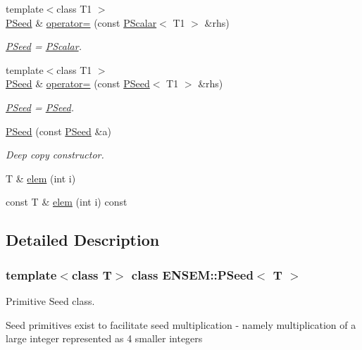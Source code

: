 \begin{DoxyCompactItemize}
{\footnotesize template$<$class T1 $>$ }\\\mbox{\hyperlink{classENSEM_1_1PSeed}{P\+Seed}} \& \mbox{\hyperlink{classENSEM_1_1PSeed_aa7d9ec1f6a7cca8ee109c29d75482350}{operator=}} (const \mbox{\hyperlink{classENSEM_1_1PScalar}{P\+Scalar}}$<$ T1 $>$ \&rhs)
\begin{DoxyCompactList}\small\item\em \mbox{\hyperlink{classENSEM_1_1PSeed}{P\+Seed}} = \mbox{\hyperlink{classENSEM_1_1PScalar}{P\+Scalar}}. \end{DoxyCompactList}\item 
{\footnotesize template$<$class T1 $>$ }\\\mbox{\hyperlink{classENSEM_1_1PSeed}{P\+Seed}} \& \mbox{\hyperlink{classENSEM_1_1PSeed_a22c88645227bfddbfea703ed71117795}{operator=}} (const \mbox{\hyperlink{classENSEM_1_1PSeed}{P\+Seed}}$<$ T1 $>$ \&rhs)
\begin{DoxyCompactList}\small\item\em \mbox{\hyperlink{classENSEM_1_1PSeed}{P\+Seed}} = \mbox{\hyperlink{classENSEM_1_1PSeed}{P\+Seed}}. \end{DoxyCompactList}\item 
\mbox{\hyperlink{classENSEM_1_1PSeed_a3a38a0e42c0c2ed2996eff03e32eebdc}{P\+Seed}} (const \mbox{\hyperlink{classENSEM_1_1PSeed}{P\+Seed}} \&a)
\begin{DoxyCompactList}\small\item\em Deep copy constructor. \end{DoxyCompactList}\item 
T \& \mbox{\hyperlink{classENSEM_1_1PSeed_aeed16139a22df65e16fd064b7808c49a}{elem}} (int i)
\item 
const T \& \mbox{\hyperlink{classENSEM_1_1PSeed_aa9151226aec3137be3417bbf36f770aa}{elem}} (int i) const
\end{DoxyCompactItemize}


\subsection{Detailed Description}
\subsubsection*{template$<$class T$>$\newline
class E\+N\+S\+E\+M\+::\+P\+Seed$<$ T $>$}

Primitive Seed class. 

Seed primitives exist to facilitate seed multiplication -\/ namely multiplication of a large integer represented as 4 smaller integers

